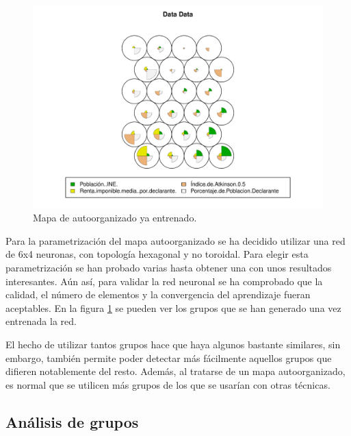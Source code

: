 \documentclass[acmtog, screen]{acmart}
\begin{document}
\begin{figure}
	\includegraphics[width=\columnwidth]{mapaKohonen}
	\caption{Mapa de autoorganizado ya entrenado.}
	\label{fig:kohonen}
\end{figure}

Para la parametrización del mapa autoorganizado se ha decidido utilizar una red de 6x4 neuronas, con topología hexagonal y no toroidal. Para elegir esta parametrización se han probado varias hasta obtener una con unos resultados interesantes. Aún así, para validar la red neuronal se ha comprobado que la calidad, el número de elementos y la convergencia del aprendizaje fueran aceptables. En la figura \ref{fig:kohonen} se pueden ver los grupos que se han generado una vez entrenada la red.

El hecho de utilizar tantos grupos hace que haya algunos bastante similares, sin embargo, también permite poder detectar más fácilmente aquellos grupos que difieren notablemente del resto. Además, al tratarse de un mapa autoorganizado, es normal que se utilicen más grupos de los que se usarían con otras técnicas.

\subsection{Análisis de grupos}
\end{document}
